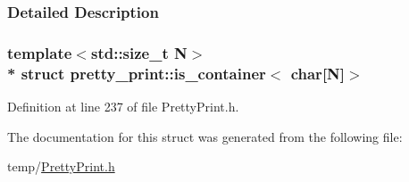 \subsubsection{Detailed Description}
\subsubsection*{template$<$std\+::size\+\_\+t N$>$\\*
struct pretty\+\_\+print\+::is\+\_\+container$<$ char\mbox{[}\+N\mbox{]}$>$}



Definition at line 237 of file Pretty\+Print.\+h.



The documentation for this struct was generated from the following file\+:\begin{DoxyCompactItemize}
\item 
temp/\hyperlink{PrettyPrint_8h}{Pretty\+Print.\+h}\end{DoxyCompactItemize}
